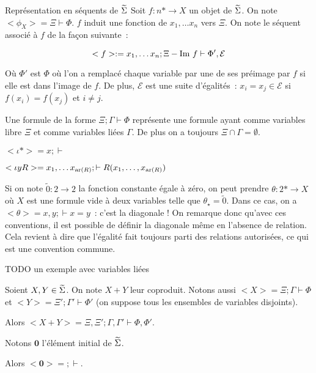 \begin{defi}{Représentation en séquents de $\widetilde{\Sigma}$}
    Soit $f : n\ast\rightarrow X$ un objet de $\widetilde{\Sigma}$. On note
    $<\phi_X> = \Xi\vdash\Phi$. $f$ induit une fonction de $x_1,\dots x_n$ vers $\Xi$.
    On note le séquent associé à $f$ de la façon suivante~:

    \[ <f> := x_1, \dots x_n; \Xi - \text{Im } f\vdash \Phi',\mathcal{E} \]

    Où $\Phi'$ est $\Phi$ où l'on a remplacé chaque variable par une de ses préimage
    par $f$ si elle est dans l'image de $f$. De plus, $\mathcal{E}$ est une suite
    d'égalités~: $x_i=x_j\in\mathcal{E}$ si $f(x_i) = f(x_j)$ et $i\neq j$.

    Une formule de la forme $\Xi;\Gamma\vdash \Phi$ représente une formule ayant comme
    variables libre $\Xi$ et comme variables liées $\Gamma$. De plus on a toujours
    $\Xi\cap\Gamma=\emptyset$.
\end{defi}

\begin{exs}
    \item $<\iota\ast> = x;\vdash$
    \item $<\iota yR> = x_1,\dots x_{\text{ar}(R)};\vdash R(x_1, \dots, x_{\text{ar}(R)})$
    \item Si on note $\tilde{0} : 2\rightarrow 2$ la fonction constante égale à
        zéro, on peut prendre $\theta : 2\ast\rightarrow X$ où $X$ est une formule
        vide à deux variables telle que $\theta_\star = \tilde{0}$. Dans ce cas, on
        a $<\theta> = x,y;\vdash x = y$~: c'est la diagonale ! On remarque donc
        qu'avec ces conventions, il est possible de définir la diagonale même en
        l'absence de relation. Cela revient à dire que l'égalité fait toujours
        parti des relations autorisées, ce qui est une convention commune.
    \item TODO un exemple avec variables liées
\end{exs}

\begin{lem}
    Soient $X,Y\in\widetilde{\Sigma}$. On note $X+Y$ leur coproduit. Notons aussi
    $<X> = \Xi;\Gamma\vdash\Phi$ et $<Y> = \Xi';\Gamma'\vdash\Phi'$ (on suppose
    tous les ensembles de variables disjoints).
    
    Alors $<X+Y> = \Xi,\Xi';\Gamma,\Gamma'\vdash\Phi,\Phi'$.
\end{lem}

\begin{lem}
    Notons $\mathbf{0}$ l'élément initial de $\widetilde{\Sigma}$.
    
    Alors $<\mathbf{0}> = ;\vdash$.
\end{lem}

